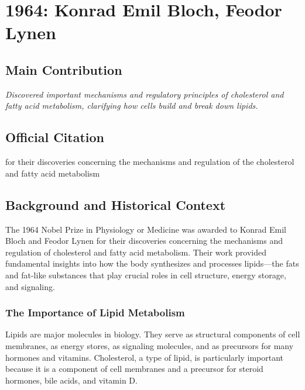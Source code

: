 \chapter[1964 --- Bloch and Lynen]{1964: Konrad Emil Bloch, Feodor Lynen}
\label{ch:1964_Bloch}

\section*{Main Contribution}

\textit{Discovered important mechanisms and regulatory principles of cholesterol and fatty acid metabolism, clarifying how cells build and break down lipids.}\cite{nobel-1964,lecture-1964,lecture-lynen-1964}

\section{Official Citation}

for their discoveries concerning the mechanisms and regulation of the cholesterol and fatty acid metabolism

\section{Background and Historical Context}

The 1964 Nobel Prize in Physiology or Medicine was awarded to Konrad Emil Bloch and Feodor Lynen for their discoveries concerning the mechanisms and regulation of cholesterol and fatty acid metabolism. Their work provided fundamental insights into how the body synthesizes and processes lipids---the fats and fat-like substances that play crucial roles in cell structure, energy storage, and signaling.

\subsection{The Importance of Lipid Metabolism}

Lipids are major molecules in biology. They serve as structural components of cell membranes, as energy stores, as signaling molecules, and as precursors for many hormones and vitamins. Cholesterol, a type of lipid, is particularly important because it is a component of cell membranes and a precursor for steroid hormones, bile acids, and vitamin D.

